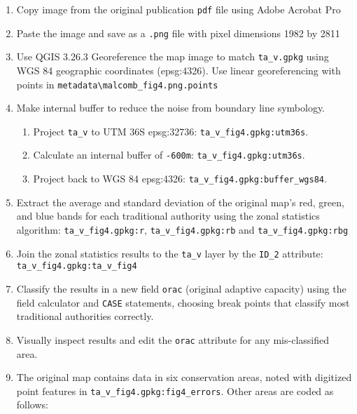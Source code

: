 \documentclass[
]{article}
\providecommand{\tightlist}{%
  \setlength{\itemsep}{0pt}\setlength{\parskip}{0pt}}
\begin{document}
\begin{enumerate}
\def\labelenumi{\arabic{enumi}.}
\tightlist
\item
  Copy image from the original publication \texttt{pdf} file using Adobe
  Acrobat Pro
\item
  Paste the image and save as a \texttt{.png} file with pixel dimensions
  1982 by 2811
\item
  Use QGIS 3.26.3 Georeference the map image to match
  \texttt{ta\_v.gpkg} using WGS 84 geographic coordinates (epsg:4326).
  Use linear georeferencing with points in
  \texttt{metadata\textbackslash{}malcomb\_fig4.png.points}
\item
  Make internal buffer to reduce the noise from boundary line symbology.

  \begin{enumerate}
  \def\labelenumii{\arabic{enumii}.}
  \tightlist
  \item
    Project \texttt{ta\_v} to UTM 36S epsg:32736:
    \texttt{ta\_v\_fig4.gpkg:utm36s}.
  \item
    Calculate an internal buffer of \texttt{-600m}:
    \texttt{ta\_v\_fig4.gpkg:utm36s}.
  \item
    Project back to WGS 84 epsg:4326:
    \texttt{ta\_v\_fig4.gpkg:buffer\_wgs84}.
  \end{enumerate}
\item
  Extract the average and standard deviation of the original map's red,
  green, and blue bands for each traditional authority using the zonal
  statistics algorithm: \texttt{ta\_v\_fig4.gpkg:r},
  \texttt{ta\_v\_fig4.gpkg:rb} and \texttt{ta\_v\_fig4.gpkg:rbg}
\item
  Join the zonal statistics results to the \texttt{ta\_v} layer by the
  \texttt{ID\_2} attribute: \texttt{ta\_v\_fig4.gpkg:ta\_v\_fig4}
\item
  Classify the results in a new field \texttt{orac} (original adaptive
  capacity) using the field calculator and \texttt{CASE} statements,
  choosing break points that classify most traditional authorities
  correctly.
\item
  Visually inspect results and edit the \texttt{orac} attribute for any
  mis-classified area.
\item
  The original map contains data in six conservation areas, noted with
  digitized point features in \texttt{ta\_v\_fig4.gpkg:fig4\_errors}.
  Other areas are coded as follows:
\end{enumerate}
\end{document}
